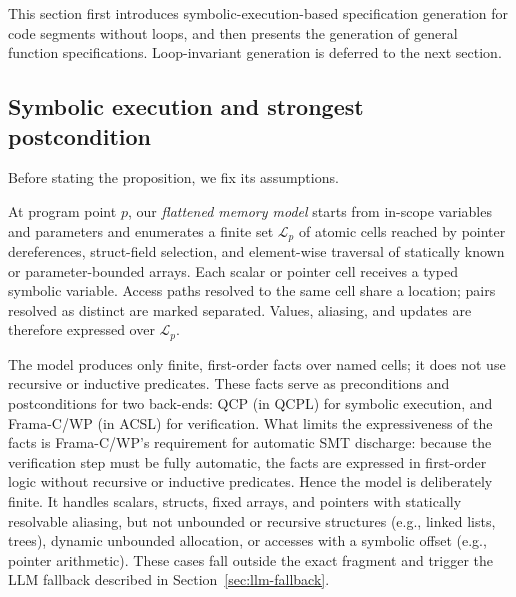 This section first introduces symbolic-execution-based specification generation for code segments without loops, and then presents the generation of general function specifications. Loop-invariant generation is deferred to the next section.

\subsection{Symbolic execution and strongest postcondition} %
Before stating the proposition, we fix its assumptions. 


At program point $p$, our \emph{flattened memory model} starts from in-scope variables and parameters and enumerates a finite set $\mathcal{L}_p$ of atomic cells reached by pointer dereferences, struct-field selection, and element-wise traversal of statically known or parameter-bounded arrays. Each scalar or pointer cell receives a typed symbolic variable. Access paths resolved to the same cell share a location; pairs resolved as distinct are marked separated. Values, aliasing, and updates are therefore expressed over $\mathcal{L}_p$.

The model produces only finite, first-order facts over named cells; it does not use recursive or inductive predicates. These facts serve as preconditions and postconditions for two back-ends: QCP (in QCPL) for symbolic execution, and Frama-C/WP (in ACSL) for verification. What limits the expressiveness of the facts is Frama-C/WP's requirement for automatic SMT discharge: because the verification step must be fully automatic, the facts are expressed in first-order logic without recursive or inductive predicates. Hence the model is deliberately finite. It handles scalars, structs, fixed arrays, and pointers with statically resolvable aliasing, but not unbounded or recursive structures (e.g., linked lists, trees), dynamic unbounded allocation, or accesses with a symbolic offset (e.g., pointer arithmetic). These cases fall outside the exact fragment and trigger the LLM fallback described in Section~\ref{sec:llm-fallback}.






